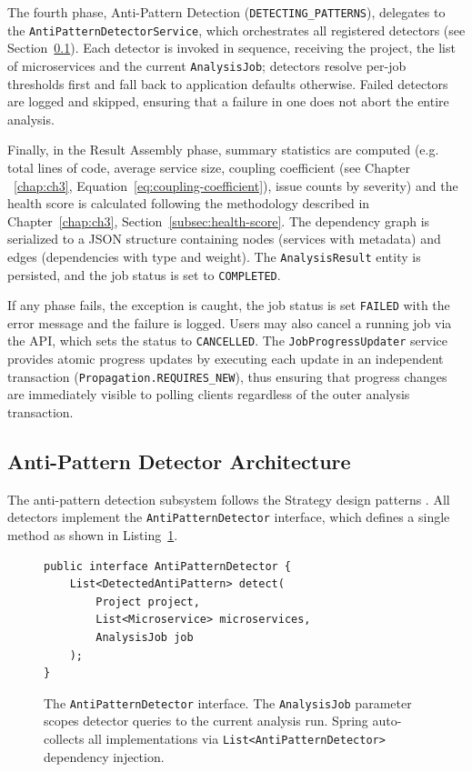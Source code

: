 The fourth phase, Anti-Pattern Detection (\texttt{DETECTING\_PATTERNS}), delegates to the \texttt{AntiPatternDetectorService}, which orchestrates all registered detectors (see Section~\ref{subsec:detector-architecture}). Each detector is invoked in sequence, receiving the project, the list of microservices and the current \texttt{AnalysisJob}; detectors resolve per-job thresholds first and fall back to application defaults otherwise. Failed detectors are logged and skipped, ensuring that a failure in one does not abort the entire analysis.

Finally, in the Result Assembly phase, summary statistics are computed (e.g. total lines of code, average service size, coupling coefficient (see Chapter ~\ref{chap:ch3}, Equation~\ref{eq:coupling-coefficient}), issue counts by severity) and the health score is calculated following the methodology described in Chapter~\ref{chap:ch3}, Section~\ref{subsec:health-score}. The dependency graph is serialized to a JSON structure containing nodes (services with metadata) and edges (dependencies with type and weight). The \texttt{AnalysisResult} entity is persisted, and the job status is set to \texttt{COMPLETED}.

If any phase fails, the exception is caught, the job status is set \texttt{FAILED} with the error message and the failure is logged. Users may also cancel a running job via the API, which sets the status to \texttt{CANCELLED}. The \texttt{JobProgressUpdater} service provides atomic progress updates by executing each update in an independent transaction (\texttt{Propagation.REQUIRES\_NEW}), thus ensuring that progress changes are immediately visible to polling clients regardless of the outer analysis transaction.

\subsection{Anti-Pattern Detector Architecture}
\label{subsec:detector-architecture}

 \par The anti-pattern detection subsystem follows the Strategy design patterns \cite{Gamma1994}. All detectors implement the \texttt{AntiPatternDetector} interface, which defines a single method as shown in Listing~\ref{lst:detector-interface}.

\begin{figure}[htbp]
    \begin{verbatim}
public interface AntiPatternDetector {
    List<DetectedAntiPattern> detect(
        Project project,
        List<Microservice> microservices,
        AnalysisJob job
    );
}
    \end{verbatim}
    \caption{The \texttt{AntiPatternDetector} interface. The \texttt{AnalysisJob} parameter scopes detector queries to the current analysis run. Spring auto-collects all implementations via \texttt{List<AntiPatternDetector>} dependency injection.}
    \label{lst:detector-interface}
\end{figure}

